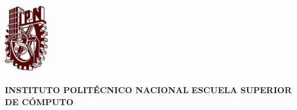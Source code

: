 \thispagestyle{empty}

\begin{minipage}[c][0.1\textheight][c]{0.2\textwidth}
	\begin{center}
    		\includegraphics[height=3cm]{portada/ipnC.jpg}
	\end{center}
\end{minipage}
\begin{minipage}[c]{0.8\textwidth}
	\begin{center}
		{\fontsize{18}{28}\selectfont \bf INSTITUTO POLITÉCNICO NACIONAL}
		{\fontsize{15}{25}\selectfont \bf ESCUELA SUPERIOR DE CÓMPUTO}
	\end{center}
\end{minipage}

